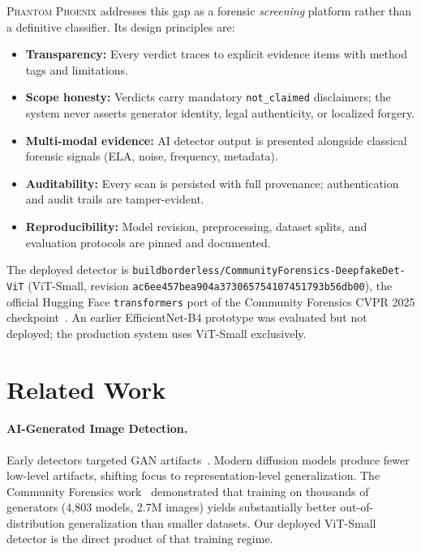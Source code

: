\documentclass[10pt,conference,compsoc]{IEEEtran}
\begin{document}
\textsc{Phantom Phoenix} addresses this gap as a forensic \emph{screening} platform rather than a definitive classifier.
Its design principles are:
\begin{itemize}
  \item \textbf{Transparency:} Every verdict traces to explicit evidence items with method tags and limitations.
  \item \textbf{Scope honesty:} Verdicts carry mandatory \texttt{not\_claimed} disclaimers; the system never asserts generator identity, legal authenticity, or localized forgery.
  \item \textbf{Multi-modal evidence:} AI detector output is presented alongside classical forensic signals (ELA, noise, frequency, metadata).
  \item \textbf{Auditability:} Every scan is persisted with full provenance; authentication and audit trails are tamper-evident.
  \item \textbf{Reproducibility:} Model revision, preprocessing, dataset splits, and evaluation protocols are pinned and documented.
\end{itemize}

The deployed detector is \texttt{buildborderless/CommunityForensics-DeepfakeDet-ViT} (ViT-Small, revision \texttt{ac6ee457bea904a373065754107451793b56db00}), the official Hugging Face \texttt{transformers} port of the Community Forensics CVPR 2025 checkpoint~\cite{park2025communityforensics}.
An earlier EfficientNet-B4 prototype was evaluated but not deployed; the production system uses ViT-Small exclusively.

\section{Related Work}
\label{sec:related}

\paragraph{AI-Generated Image Detection.}
Early detectors targeted GAN artifacts~\cite{wang2020cnn-generated, zhang2019detecting}. Modern diffusion models produce fewer low-level artifacts, shifting focus to representation-level generalization.
The Community Forensics work~\cite{park2025communityforensics} demonstrated that training on thousands of generators (4,803 models, 2.7M images) yields substantially better out-of-distribution generalization than smaller datasets.
Our deployed ViT-Small detector is the direct product of that training regime.
\end{document}
